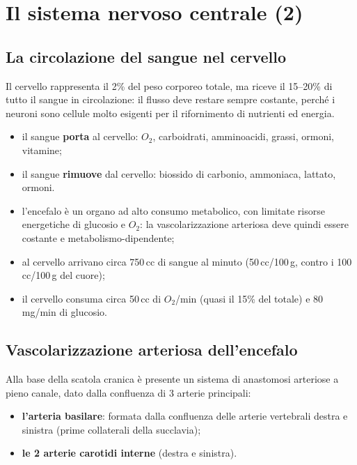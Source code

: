 \chapter{Il sistema nervoso centrale (2)}

\section{La circolazione del sangue nel cervello}

Il cervello rappresenta il 2\% del peso corporeo totale, ma riceve il 15--20\% di
tutto il sangue in circolazione: il flusso deve restare sempre costante, perché i
neuroni sono cellule molto esigenti per il rifornimento di nutrienti ed energia.

\begin{itemize}
  \item il sangue \textbf{porta} al cervello: $O_2$, carboidrati, amminoacidi,
    grassi, ormoni, vitamine;
  \item il sangue \textbf{rimuove} dal cervello: biossido di carbonio, ammoniaca,
    lattato, ormoni.
\end{itemize}

\begin{itemize}
  \item l'encefalo è un organo ad alto consumo metabolico, con limitate risorse
    energetiche di glucosio e $O_2$: la vascolarizzazione arteriosa deve quindi
    essere costante e metabolismo-dipendente;
  \item al cervello arrivano circa 750\,cc di sangue al minuto (50\,cc/100\,g,
    contro i 100\,cc/100\,g del cuore);
  \item il cervello consuma circa 50\,cc di $O_2$/min (quasi il 15\% del totale)
    e 80\,mg/min di glucosio.
\end{itemize}

\section{Vascolarizzazione arteriosa dell'encefalo}

Alla base della scatola cranica è presente un sistema di anastomosi arteriose a
pieno canale, dato dalla confluenza di 3 arterie principali:
\begin{itemize}
  \item \textbf{l'arteria basilare}: formata dalla confluenza delle arterie
    vertebrali destra e sinistra (prime collaterali della succlavia);
  \item \textbf{le 2 arterie carotidi interne} (destra e sinistra).
\end{itemize}

